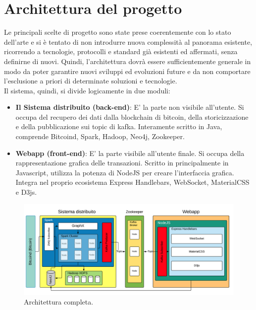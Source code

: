 \section{Architettura  del progetto}
\label{sec:architettura del progetto}
Le principali scelte di progetto sono state prese coerentemente con lo stato dell'arte e si è tentato di non introdurre nuova complessità al panorama esistente, ricorrendo a tecnologie, protocolli e standard già esistenti ed affermati, senza definirne di nuovi. Quindi, l'architettura dovrà essere sufficientemente generale in modo da poter garantire nuovi sviluppi ed evoluzioni future e da non comportare l'esclusione a priori di determinate soluzioni e tecnologie. 
\\Il sistema, quindi, si divide logicamente in due moduli:
\begin{itemize}
	\item \textbf{Il Sistema distribuito (back-end)}: E' la parte non visibile all'utente. Si occupa del recupero dei dati dalla blockchain di bitcoin, della storicizzazione e della pubblicazione sui topic di kafka. Interamente scritto in Java, comprende Bitcoind, Spark, Hadoop, Neo4j, Zookeeper.
	\item \textbf{Webapp (front-end)}: E' la parte visibile all'utente finale. Si occupa della rappresentazione grafica delle transazioni. Scritto in principalmente in Javascript, utilizza la potenza di NodeJS per creare l'interfaccia grafica. Integra nel proprio ecosistema Express Handlebars, WebSocket, MaterialCSS e D3js.
\end{itemize}

\begin{figure}[H]
	\centering
	\includegraphics[width=\textwidth]{images/architetturaTesi.png}
	\caption{Architettura completa.}
	\label{fig:softwareArchitetture}
\end{figure}
 
